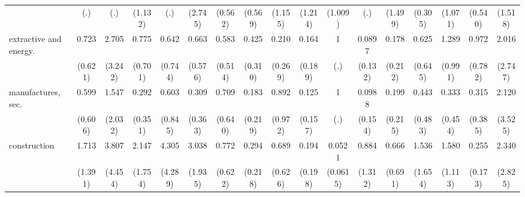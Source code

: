 {\begin{tabular}{l*{16}{c}}
                    &         (.)         &         (.)         &     (1.132)         &         (.)         &     (2.745)         &     (0.562)         &     (0.569)         &     (1.155)         &     (1.214)         &     (1.009)         &         (.)         &     (1.499)         &     (0.305)         &     (1.071)         &     (0.540)         &     (1.518)         \\
[1em]
extractive and energy.&       0.723         &       2.705         &       0.775         &       0.642         &       0.663         &       0.583         &       0.425         &       0.210         &       0.164         &           1         &      0.0897         &       0.178         &       0.625         &       1.289         &       0.972         &       2.016         \\
                    &     (0.621)         &     (3.242)         &     (0.701)         &     (0.744)         &     (0.576)         &     (0.514)         &     (0.310)         &     (0.269)         &     (0.189)         &         (.)         &     (0.132)         &     (0.212)         &     (0.645)         &     (0.991)         &     (0.782)         &     (2.747)         \\
[1em]
manufactures, sec.  &       0.599         &       1.547         &       0.292         &       0.603         &       0.309         &       0.709         &       0.183         &       0.892         &       0.125         &           1         &      0.0988         &       0.199         &       0.443         &       0.333         &       0.315         &       2.120         \\
                    &     (0.606)         &     (2.032)         &     (0.351)         &     (0.845)         &     (0.363)         &     (0.640)         &     (0.219)         &     (0.972)         &     (0.157)         &         (.)         &     (0.154)         &     (0.215)         &     (0.483)         &     (0.454)         &     (0.385)         &     (3.525)         \\
[1em]
construction        &       1.713         &       3.807         &       2.147         &       4.305         &       3.038         &       0.772         &       0.294         &       0.689         &       0.194         &      0.0521\sym{*}  &       0.884         &       0.666         &       1.536         &       1.580         &       0.255\sym{*}  &       2.340         \\
                    &     (1.391)         &     (4.454)         &     (1.754)         &     (4.289)         &     (1.935)         &     (0.622)         &     (0.218)         &     (0.626)         &     (0.198)         &    (0.0615)         &     (1.312)         &     (0.691)         &     (1.654)         &     (1.113)         &     (0.173)         &     (2.825)         \\

\end{tabular}}
